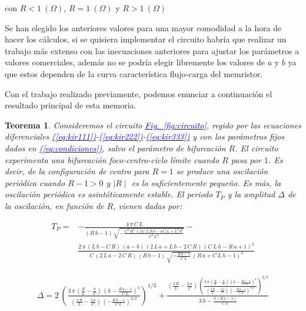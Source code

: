 \documentclass[12pt,a4paper]{report} %
\newtheorem{theorem}{Teorema}[chapter]
\newcommand{\fref}[1]{\hyperref[#1]{\textcolor{blue}{Fig.~\ref*{#1}}}}
\newcommand{\eref}[1]{\hyperref[#1]{\textcolor{blue}{(\ref*{#1})}}}
\newcommand{\fref}[1]{\hyperref[#1]{\textcolor{blue}{\textit{Fig.~\ref*{#1}}}}}
\newcommand{\eref}[1]{\hyperref[#1]{\textcolor{blue}{\textit{(\ref*{#1})}}}}
\begin{document}
	\noindent \noindent con $R<1\:(\Omega)$, $R=1\:(\Omega)$ y $R>1\:(\Omega)$
	
	\vspace{0.5cm} Se han elegido los anteriores valores para una mayor comodidad a la hora de hacer los cálculos, si se quisiera implementar el circuito habría que realizar un trabajo más extenso con las inecuaciones anteriores para ajustar los parámetros a valores comerciales, además no se podría elegir libremente los valores de $a$ y $b$ ya que estos dependen de la curva característica flujo-carga del memristor.
	
	\vspace{0.5cm} Con el trabajo realizado previamente, podemos enunciar a continuación el resultado principal de esta memoria.
	
	\begin{theorem}
		\label{teo.principal}
		Consideremos el circuito \fref{fig:circuito}, regido por las ecuaciones diferenciales \eref{eq:kir111}-\eref{eq:kir222}-\eref{eq:kir333} y con los parámetros fijos dados en \eref{eq:condiciones}, salvo el parámetro de bifurcación $R$. El circuito experimenta una bifurcación foco-centro-ciclo límite cuando $R$ pasa por $1$. Es decir, de la configuración de centro para $R=1$ se produce una oscilación periódica  cuando $R-1>0$ y $\mid R \mid$ es lo suficientemente pequeño. Es más, la oscilación periódica es asintóticamente estable. El periodo $T_P$ y la amplitud $\varDelta$ de la oscilación, en función de $R$, vienen dadas por:
		
		\begin{equation}
			\label{eq:perR}
			\begin{aligned}
			T_P=&-\frac{4\,\pi \,C\,L}{\left(R\,b-1\right)\,\sqrt{-\frac{C^2\,R^2+2\,C\,L\,R\,b-4\,C\,L+L^2\,b^2}{C^2\,L^2}}}- \\
			&\frac{2\,\pi \,\left(L\,b-C\,R\right)\,\left(a-b\right)\,\left(2\,L\,a+L\,b-2\,C\,R\right)\,{\left(C\,L\,h-R\,a+1\right)}^3}{C\,\left(2\,L\,a-2\,C\,R\right)\,\left(R\,b-1\right)\,\sqrt{-\frac{R\,b-1}{C\,L}}\,{\left(R\,a+C\,L\,h-1\right)}^3}
			\end{aligned}	
		\end{equation}\smallskip
		
		\begin{equation}
			\label{eq:ampR}
			\begin{aligned}
				\varDelta=2\,{\left(\frac{3\,\pi \,\left(\frac{R}{L}-\frac{b}{C}\right)\,{\left(h-\frac{R\,a-1}{C\,L}\right)}^3}{\left(\frac{2\,R}{L}-\frac{2\,a}{C}\right)\,{\left(-\frac{R\,b-1}{C\,L}\right)}^{3/2}}\right)}^{1/3}+\frac{\left(\frac{2\,R}{L}-\frac{2\,a}{C}\right)\,{\left(\frac{3\,\pi \,\left(\frac{R}{L}-\frac{b}{C}\right)\,{\left(h-\frac{R\,a-1}{C\,L}\right)}^3}{\left(\frac{2\,R}{L}-\frac{2\,a}{C}\right)\,{\left(-\frac{R\,b-1}{C\,L}\right)}^{3/2}}\right)}^{2/3}}{3\,h-\frac{3\,\left(R\,a-1\right)}{C\,L}}
			\end{aligned}
		\end{equation}
		
		
	\end{theorem}\smallskip
	
\end{document}

